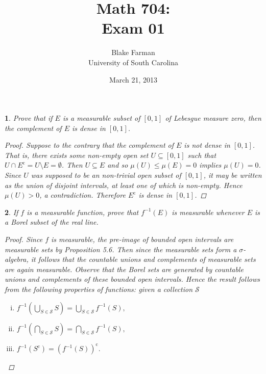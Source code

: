 \documentclass[12pt]{amsart}
\author{Blake Farman\\University of South Carolina}
\title{Math 704:\\Exam 01}
\date{March 21, 2013}
\begin{document}
\maketitle

\providecommand{\p}{\mathfrak{p}}
\providecommand{\m}{\mathfrak{m}}

\newtheorem{thm}{}
\newtheorem{lem}{Lemma}

\setcounter{thm}{5}

\begin{thm}
  Prove that if $E$ is a measurable subset of $[0,1]$ of Lebesgue measure zero, then the complement of $E$ is dense in $[0,1]$.

  \begin{proof}
    Suppose to the contrary that the complement of $E$ is not dense in $[0,1]$.
    That is, there exists some non-empty open set $U \subseteq [0,1]$ such that $U \cap E^\text{c} = U \setminus E = \emptyset$.
    Then $U \subseteq E$ and so $\mu(U) \leq \mu(E) = 0$ implies $\mu(U) = 0$.
    Since $U$ was supposed to be an non-trivial open subset of $[0,1]$, it may be written as the union of disjoint intervals, at least one of which is non-empty.
    Hence $\mu(U) > 0$, a contradiction.
    Therefore $E^\text{c}$ is dense in $[0,1]$.
  \end{proof}
\end{thm}
\pagebreak

\setcounter{thm}{7}

\begin{thm}
  If $f$ is a measurable function, prove that $f^{-1}(E)$ is measurable whenever $E$ is a Borel subset of the real line.
  
  \begin{proof}
    Since $f$ is measurable, the pre-image of bounded open intervals are measurable sets by Proposition 5.6.
    Then since the measurable sets form a $\sigma$-algebra, it follows that the countable unions and complements of measurable sets are again measurable.
    Observe that the Borel sets are generated by countable unions and complements of these bounded open intervals.
    Hence the result follows from the following properties of functions: given a collection $\mathcal{S}$
    \begin{enumerate}[(i)]
      \item
        $f^{-1}\left(\bigcup_{S \in \mathcal{S}} S\right) = \bigcup_{S \in \mathcal{S}} f^{-1}(S),$
      \item
        $f^{-1}\left(\bigcap_{S \in \mathcal{S}} S\right) = \bigcap_{S \in \mathcal{S}} f^{-1}(S),$  
      \item
        $f^{-1}(S^\text{c}) = (f^{-1}(S))^\text{c}.$
    \end{enumerate}
  \end{proof}
\end{thm}
\pagebreak
\end{document}
